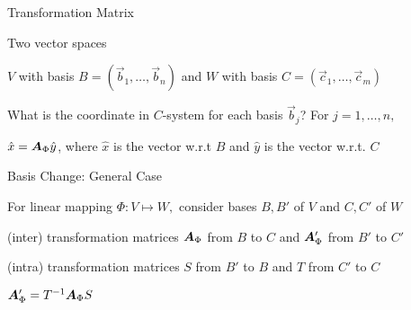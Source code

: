 \documentclass[handout,fleqn,aspectratio=169]{beamer}
\begin{document}
\begin{frame}{Transformation Matrix}

\plitemsep 0.05in

\bci 
\item Two vector spaces 
\bci
\item $V$ with basis $B=(\vec{b}_1, \ldots, \vec{b}_n)$ and $W$ with basis $C=(\vec{c}_1, \ldots, \vec{c}_m)$
\eci

\item What is the coordinate in $C$-system for each basis $\vec{b}_j$? For $j=1, \ldots, n,$
{\small
{}}

\item $\hat{x} = \bm{A}_{\Phi} \hat{y}$, where $\hat{x}$ is the vector w.r.t $B$ and $\hat{y}$ is the vector w.r.t. $C$

\eci

\end{frame}

\begin{frame}{Basis Change: General Case}

\plitemsep 0.1in

\bci 
\item For linear mapping $\Phi: V \mapsto W,$ consider bases $B,B'$ of $V$ and $C,C'$ of $W$ 
\item (inter) transformation matrices $\bm{A}_{\Phi}$ from $B$ to $C$ and $\bm{A}'_{\Phi}$ from $B'$ to $C'$
\item (intra) transformation matrices $S$ from $B'$ to $B$ and $T$ from $C'$ to $C$
\item \thm $\bm{A}'_{\Phi} = {{T}^{-1}} \bm{A}_{\Phi} S$

\eci

\end{frame}
\end{document}
